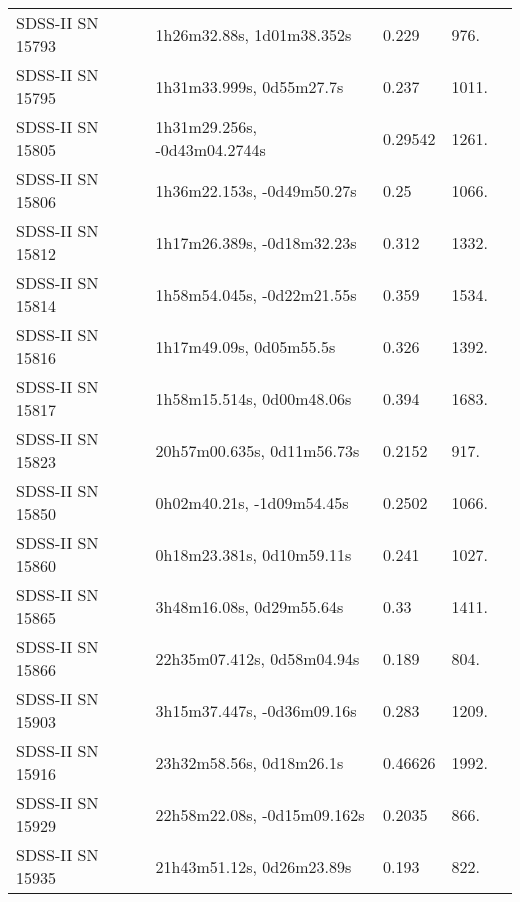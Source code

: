 \begin{longtable}{lllll}
 SDSS-II SN 15793 &      1h26m32.88s, 1d01m38.352s &    0.229 &           976. &    \citet{2011ApJ...738..162S} \\
 SDSS-II SN 15795 &       1h31m33.999s, 0d55m27.7s &    0.237 &          1011. &    \citet{2011ApJ...738..162S} \\
 SDSS-II SN 15805 &   1h31m29.256s, -0d43m04.2744s &  0.29542 &          1261. &    \citet{2016SDSSD.C...0000:} \\
 SDSS-II SN 15806 &     1h36m22.153s, -0d49m50.27s &     0.25 &          1066. &    \citet{2011ApJ...738..162S} \\
 SDSS-II SN 15812 &     1h17m26.389s, -0d18m32.23s &    0.312 &          1332. &    \citet{2010ApJ...713.1026D} \\
 SDSS-II SN 15814 &     1h58m54.045s, -0d22m21.55s &    0.359 &          1534. &    \citet{2011ApJ...738..162S} \\
 SDSS-II SN 15816 &        1h17m49.09s, 0d05m55.5s &    0.326 &          1392. &    \citet{2010ApJ...713.1026D} \\
 SDSS-II SN 15817 &      1h58m15.514s, 0d00m48.06s &    0.394 &          1683. &    \citet{2010ApJ...713.1026D} \\
 SDSS-II SN 15823 &     20h57m00.635s, 0d11m56.73s &   0.2152 &           917. &    \citet{2011ApJ...738..162S} \\
 SDSS-II SN 15850 &      0h02m40.21s, -1d09m54.45s &   0.2502 &          1066. &    \citet{2011ApJ...738..162S} \\
 SDSS-II SN 15860 &      0h18m23.381s, 0d10m59.11s &    0.241 &          1027. &    \citet{2011ApJ...738..162S} \\
 SDSS-II SN 15865 &       3h48m16.08s, 0d29m55.64s &     0.33 &          1411. &    \citet{2011ApJ...738..162S} \\
 SDSS-II SN 15866 &     22h35m07.412s, 0d58m04.94s &    0.189 &           804. &    \citet{2011ApJ...738..162S} \\
 SDSS-II SN 15903 &     3h15m37.447s, -0d36m09.16s &    0.283 &          1209. &    \citet{2010ApJ...713.1026D} \\
 SDSS-II SN 15916 &       23h32m58.56s, 0d18m26.1s &  0.46626 &          1992. &    \citet{2016SDSSD.C...0000:} \\
 SDSS-II SN 15929 &    22h58m22.08s, -0d15m09.162s &   0.2035 &           866. &    \citet{2011ApJ...738..162S} \\
 SDSS-II SN 15935 &      21h43m51.12s, 0d26m23.89s &    0.193 &           822. &    \citet{2011ApJ...738..162S} \\

\end{longtable}
